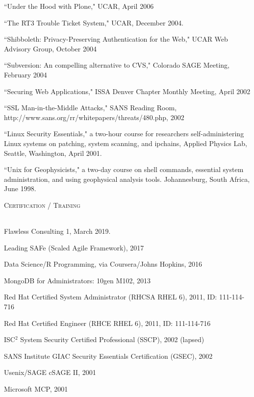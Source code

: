 \documentclass{article}
\newcommand{\lineunder}{\vspace*{-8pt} \\ \hspace*{-18pt} \hrulefill \\}
\newcommand{\header}[1]{{\hspace*{-15pt}\vspace*{6pt} \textsc{#1}} \vspace*{-6pt} \lineunder}
\newenvironment{achievements}{\begin{list}{\topsep 0pt \itemsep -2pt}} {\vspace*{4pt}\end{list}}
\begin{document}
\begin{achievements}
\item ``Under the Hood with Plone," UCAR, April 2006
\item ``The RT3 Trouble Ticket System," UCAR, December 2004.
\item ``Shibboleth: Privacy-Preserving Authentication for the Web," UCAR Web Advisory Group, October 2004
\item ``Subversion: An compelling alternative to CVS," Colorado SAGE Meeting, February 2004
\item ``Securing Web Applications," ISSA Denver Chapter Monthly Meeting, April 2002
\item ``SSL Man-in-the-Middle Attacks," SANS Reading Room, http://www.sans.org/rr/whitepapers/threats/480.php, 2002
\item ``Linux Security Essentials," a two-hour course for researchers self-administering Linux systems on patching, system scanning, and ipchains,  Applied Physics Lab, Seattle, Washington, April 2001.
\item ``Unix for Geophysicists," a two-day course on shell commands, essential system administration, and using geophysical analysis tools.  Johannesburg, South Africa, June 1998.
\end{achievements}


\header{Certification / Training}
\begin{achievements}
\item Flawless Consulting 1, March 2019.
\item Leading SAFe (Scaled Agile Framework), 2017
\item Data Science/R Programming, via Coursera/Johns Hopkins, 2016
\item MongoDB for Administrators: 10gen M102, 2013
\item Red Hat Certified System Administrator (RHCSA RHEL 6), 2011, ID: 111-114-716
\item Red Hat Certified Engineer (RHCE RHEL 6), 2011, ID: 111-114-716
\item ISC$^{2}$ System Security Certified Professional (SSCP), 2002 (lapsed)
\item SANS Institute GIAC Security Essentials Certification (GSEC), 2002
\item Usenix/SAGE cSAGE II, 2001
\item Microsoft MCP, 2001
\end{achievements}
\end{document}
